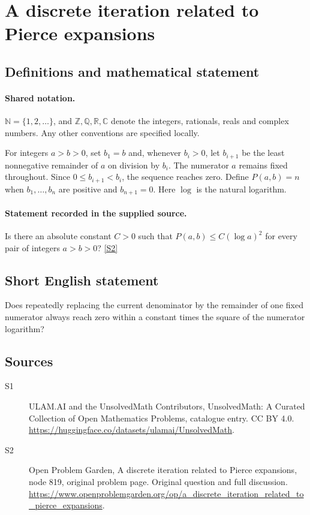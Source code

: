 \documentclass[11pt]{article}
\newcommand{\sref}[2]{\hyperlink{source:#1:#2}{[S#2]}}
\begin{document}
\section{A discrete iteration related to Pierce expansions}\label{statement}

\subsection{Definitions and mathematical statement}

\paragraph{Shared notation.}$\mathbb N=\{1,2,\ldots\}$, and $\mathbb Z,\mathbb Q,\mathbb R,\mathbb C$ denote the integers, rationals, reals and complex numbers. Any other conventions are specified locally.


For integers $a>b>0$, set $b_1=b$ and, whenever $b_i>0$, let $b_{i+1}$ be the least nonnegative remainder of $a$ on division by $b_i$. The numerator $a$ remains fixed throughout. Since $0\leq b_{i+1}<b_i$, the sequence reaches zero. Define $P(a,b)=n$ when $b_1,\ldots,b_n$ are positive and $b_{n+1}=0$. Here $\log$ is the natural logarithm.
\paragraph{Statement recorded in the supplied source.}
Is there an absolute constant $C>0$ such that $P(a,b)\leq C(\log a)^2$ for every pair of integers $a>b>0$? \sref{statement}{2}
\subsection{Short English statement}
Does repeatedly replacing the current denominator by the remainder of one fixed numerator always reach zero within a constant times the square of the numerator logarithm?
\subsection{Sources}
\begin{description}
\item[\hypertarget{source:statement:1}{S1}] ULAM.AI and the UnsolvedMath Contributors, UnsolvedMath: A Curated Collection of Open Mathematics Problems, catalogue entry. CC BY 4.0. \url{https://huggingface.co/datasets/ulamai/UnsolvedMath}.
\item[\hypertarget{source:statement:2}{S2}] Open Problem Garden, A discrete iteration related to Pierce expansions, node 819, original problem page. Original question and full discussion. \url{https://www.openproblemgarden.org/op/a_discrete_iteration_related_to_pierce_expansions}.

\end{description}
\label{end:statement}
\end{document}
